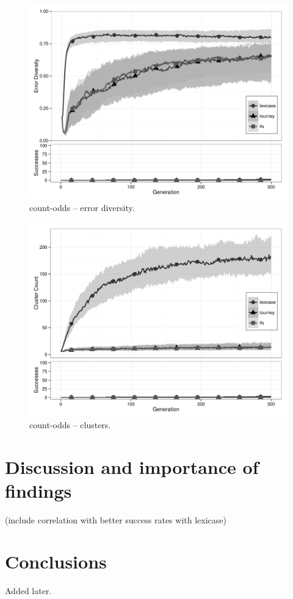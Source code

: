 \begin{figure}%
\centering
\includegraphics[width=11.5cm]{count-odds-diversity.pdf}
\caption{count-odds -- error diversity.}
\label{count-oddsDiv}
\end{figure}

\begin{figure}%
\centering
\includegraphics[width=11.5cm]{count-odds-cluster.pdf}
\caption{count-odds -- clusters.}
\label{count-oddsClu}
\end{figure}


\section{Discussion and importance of findings}

(include correlation with better success rates with lexicase)

\section{Conclusions}


\begin{acknowledgement}
Added later.
\end{acknowledgement}



